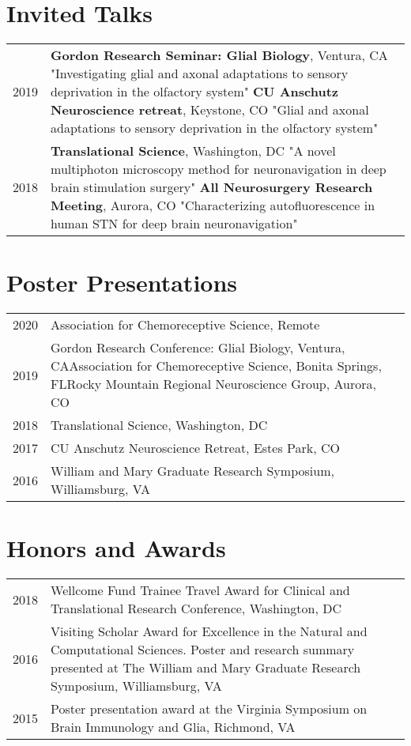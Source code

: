 \documentclass[11pt]{article}
\begin{document}
\section*{Invited Talks}
\label{sec:org85ca05e}
\begin{tabular}{lp{}}

2019& \textbf{Gordon Research Seminar: Glial Biology}, Ventura, CA \newline "Investigating glial and axonal adaptations to sensory deprivation in the olfactory system"\newline
\textbf{CU Anschutz Neuroscience retreat}, Keystone, CO \newline "Glial and axonal adaptations to sensory deprivation in the olfactory system" \\
2018& \textbf{Translational Science}, Washington, DC \newline "A novel multiphoton microscopy method for neuronavigation in deep brain stimulation surgery"
 \newline \textbf{All Neurosurgery Research Meeting}, Aurora, CO \newline "Characterizing autofluorescence in human STN for deep brain neuronavigation"\\
\end{tabular}
\section*{Poster Presentations}
\label{sec:org6ec7e51}
\begin{tabular}{lp{}}
2020& Association for Chemoreceptive Science, Remote\\
2019& Gordon Research Conference: Glial Biology, Ventura, CA\newline Association for Chemoreceptive Science, Bonita Springs, FL\newline Rocky Mountain Regional Neuroscience Group, Aurora, CO\\
2018& Translational Science, Washington, DC\\
2017& CU Anschutz Neuroscience Retreat, Estes Park, CO\\
2016& William and Mary Graduate Research Symposium, Williamsburg, VA
\end{tabular}
\section*{Honors and Awards}
\label{sec:orgb449490}
\begin{tabular}{lp{}}
2018& Wellcome Fund Trainee Travel Award for Clinical and Translational Research Conference, Washington, DC\\
2016& Visiting Scholar Award for Excellence in the Natural and Computational Sciences. Poster and research summary presented at The William and Mary Graduate Research Symposium, Williamsburg, VA \\
2015& Poster presentation award at the Virginia Symposium on Brain Immunology and Glia, Richmond, VA
\end{tabular}
\end{document}
